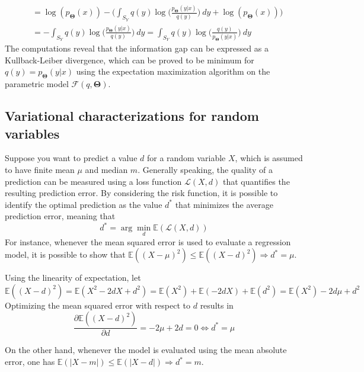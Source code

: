 \documentclass{report}
\begin{document}
\begin{examplebox}
\begin{align*}
            &= \log(p_{\mathbf{\Theta}}(x)) - \Bigg(\int_{S_Y} q(y)\log\Bigg(\frac{p_{\mathbf{\Theta}}(y|x)}{q(y)}\Bigg) \ dy + \log(p_{\mathbf{\Theta}}(x))\Bigg) \\
            &= -\int_{S_Y} q(y)\log\Bigg(\frac{p_{\mathbf{\Theta}}(y|x)}{q(y)}\Bigg) \ dy = \int_{S_Y} q(y)\log\Bigg(\frac{q(y)}{p_{\mathbf{\Theta}}(y|x)}\Bigg) \ dy
    \end{align*}
    The computations reveal that the information gap can be expressed as a Kullback-Leiber divergence, which can be proved to be minimum for $\displaystyle q(y) = p_{\mathbf{\Theta}}(y|x)$ using the expectation maximization algorithm on the parametric model $\displaystyle \mathcal{F}(q, \mathbf{\Theta})$.
\end{examplebox}
\subsection{Variational characterizations for random variables}
Suppose you want to predict a value $\displaystyle d$ for a random variable $\displaystyle X$, which is assumed to have finite mean $\displaystyle \mu$ and median $\displaystyle m$. \newline
Generally speaking, the quality of a prediction can be measured using a loss function $\displaystyle \mathcal{L}(X, d)$ that quantifies the resulting prediction error. \newline
By considering the risk function, it is possible to identify the optimal prediction as the value $\displaystyle d^*$ that minimizes the average prediction error, meaning that
\[d^* = \arg\min_d \mathbb{E}(\mathcal{L}(X, d))\]
For instance, whenever the mean squared error is used to evaluate a regression model, it is possible to show that $\displaystyle \mathbb{E}((X - \mu)^2) \leq \mathbb{E}((X - d)^2) \Rightarrow d^* = \mu$.
\begin{proofbox}
    Using the linearity of expectation, let
    \[\mathbb{E}((X - d)^2) = \mathbb{E}(X^2 - 2dX + d^2) = \mathbb{E}(X^2) + \mathbb{E}(-2dX) + \mathbb{E}(d^2) = \mathbb{E}(X^2) - 2d\mu + d^2\]
    Optimizing the mean squared error with respect to $\displaystyle d$ results in
    \[\frac{\partial\mathbb{E}((X - d)^2)}{\partial d} = -2\mu + 2d = 0 \Leftrightarrow d^* = \mu\]
\end{proofbox}
\noindent On the other hand, whenever the model is evaluated using the mean absolute error, one has $\displaystyle \mathbb{E}(|X - m|) \leq \mathbb{E}(|X - d|) \Rightarrow d^* = m$.
\end{document}
